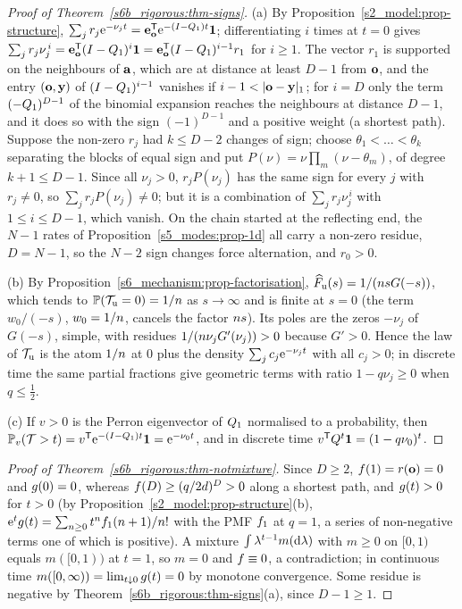 \begin{proof}[Proof of Theorem~\ref{s6b_rigorous:thm-signs}]
(a) By Proposition~\ref{s2_model:prop-structure}, $\sum_jr_j\mathrm{e}^{-\nu_jt}=\mathbf{e}_{\mathbf{o}}^{\mathsf{T}}\mathrm{e}^{-(I-Q_1)t}\mathbf{1}$;
differentiating $i$ times at $t=0$ gives $\sum_jr_j\nu_j^{\,i}=\mathbf{e}_{\mathbf{o}}^{\mathsf{T}}(I-Q_1)^{i}\mathbf{1}
=\mathbf{e}_{\mathbf{o}}^{\mathsf{T}}(I-Q_1)^{i-1}r_1$ for $i\ge1$. The vector $r_1$ is supported on the neighbours of $\mathbf{a}$, which are
at distance at least $D-1$ from $\mathbf{o}$, and the entry $(\mathbf{o},\mathbf{y})$ of $(I-Q_1)^{i-1}$ vanishes if $i-1<|\vo-\vy|_1$;
for $i=D$ only the term $(-Q_1)^{D-1}$ of the binomial expansion reaches the neighbours at distance $D-1$, and it
does so with the sign $(-1)^{D-1}$ and a positive weight (a shortest path). Suppose the non-zero $r_j$ had $k\le D-2$
changes of sign; choose $\theta_1<\dots<\theta_k$ separating the blocks of equal sign and put
$P(\nu)=\nu\prod_m(\nu-\theta_m)$, of degree $k+1\le D-1$. Since all $\nu_j>0$, $r_jP(\nu_j)$ has the same sign for
every $j$ with $r_j\ne0$, so $\sum_jr_jP(\nu_j)\ne0$; but it is a combination of $\sum_jr_j\nu_j^{\,i}$ with
$1\le i\le D-1$, which vanish. On the chain started at the reflecting end, the $N-1$ rates of
Proposition~\ref{s5_modes:prop-1d} all carry a non-zero residue, $D=N-1$, so the $N-2$ sign changes force
alternation, and $r_0>0$.

(b) By Proposition~\ref{s6_mechanism:prop-factorisation}, $\widehat{F}_{\mathrm u}(s)=1/(n sG(-s))$, which tends to
$\mathbb{P}(\mathcal{T}_{\mathrm u}=0)=1/n$ as $s\to\infty$ and is finite at $s=0$ (the term $w_0/(-s)$, $w_0=1/n$, cancels the
factor $n s$). Its poles are the zeros $-\nu_j$ of $G(-s)$, simple, with residues
$1/(n\nu_jG'(\nu_j))>0$ because $G'>0$. Hence the law of $\mathcal{T}_{\mathrm u}$ is the atom $1/n$ at $0$ plus the
density $\sum_jc_j\mathrm{e}^{-\nu_jt}$ with all $c_j>0$; in discrete time the same partial fractions give geometric
terms with ratio $1-q\nu_j\ge0$ when $q\le\frac12$.

(c) If $v>0$ is the Perron eigenvector of $Q_1$ normalised to a probability, then
$\mathbb{P}_v(\mathcal{T}>t)=v^{\mathsf{T}}\mathrm{e}^{-(I-Q_1)t}\mathbf{1}=\mathrm{e}^{-\nu_0t}$, and in discrete time $v^{\mathsf{T}}Q^{t}\mathbf{1}=(1-q\nu_0)^{t}$.
\end{proof}

\begin{proof}[Proof of Theorem~\ref{s6b_rigorous:thm-notmixture}]
Since $D\ge2$, $f(1)=r(\mathbf{o})=0$ and $g(0)=0$, whereas $f(D)\ge(q/2d)^{D}>0$ along a shortest path, and
$g(t)>0$ for $t>0$ (by Proposition~\ref{s2_model:prop-structure}(b), $\mathrm{e}^{t}g(t)=\sum_{n\ge0}t^{n}f_1(n+1)/n!$
with the PMF $f_1$ at $q=1$, a series of non-negative terms one of which is positive). A mixture
$\int\lambda^{t-1}m(\mathrm{d}\lambda)$ with $m\ge0$ on $[0,1)$ equals $m([0,1))$ at $t=1$, so $m=0$ and $f\equiv0$, a
contradiction; in continuous time $m([0,\infty))=\lim_{t\downarrow0}g(t)=0$ by monotone convergence. Some residue
is negative by Theorem~\ref{s6b_rigorous:thm-signs}(a), since $D-1\ge1$.
\end{proof}

